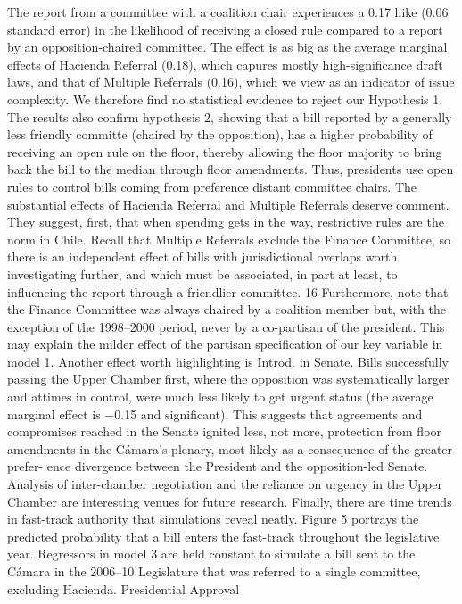 \documentclass[letter,12pt]{article}
\begin{document}
The report from a committee with a coalition chair experiences a 0.17
hike (0.06 standard error) in the likelihood of receiving a closed rule compared to a report by an
opposition-chaired committee. The effect is as big as the average marginal effects of Hacienda
Referral (0.18), which capures mostly high-significance draft laws, and that of Multiple Referrals
(0.16), which we view as an indicator of issue complexity. We therefore find no statistical evidence
to reject our Hypothesis 1. The results also confirm hypothesis 2, showing that a bill reported by a
generally less friendly committe (chaired by the opposition), has a higher probability of receiving
an open rule on the floor, thereby allowing the floor majority to bring back the bill to the median
through floor amendments. Thus, presidents use open rules to control bills coming from preference
distant committee chairs.
The substantial effects of Hacienda Referral and Multiple Referrals deserve comment. They
suggest, first, that when spending gets in the way, restrictive rules are the norm in Chile. Recall
that Multiple Referrals exclude the Finance Committee, so there is an independent effect of bills
with jurisdictional overlaps worth investigating further, and which must be associated, in part at
least, to influencing the report through a friendlier committee. 16 Furthermore, note that the Finance
Committee was always chaired by a coalition member but, with the exception of the 1998–2000
period, never by a co-partisan of the president. This may explain the milder effect of the partisan
specification of our key variable in model 1.
Another effect worth highlighting is Introd. in Senate. Bills successfully passing the Upper
Chamber first, where the opposition was systematically larger and attimes in control, were much
less likely to get urgent status (the average marginal effect is −0.15 and significant). This suggests
that agreements and compromises reached in the Senate ignited less, not more, protection from
floor amendments in the Cámara’s plenary, most likely as a consequence of the greater prefer-
ence divergence between the President and the opposition-led Senate. Analysis of inter-chamber
negotiation and the reliance on urgency in the Upper Chamber are interesting venues for future
research.
Finally, there are time trends in fast-track authority that simulations reveal neatly. Figure 5
portrays the predicted probability that a bill enters the fast-track throughout the legislative year.
Regressors in model 3 are held constant to simulate a bill sent to the Cámara in the 2006–10
Legislature that was referred to a single committee, excluding Hacienda. Presidential Approval
\end{document}
